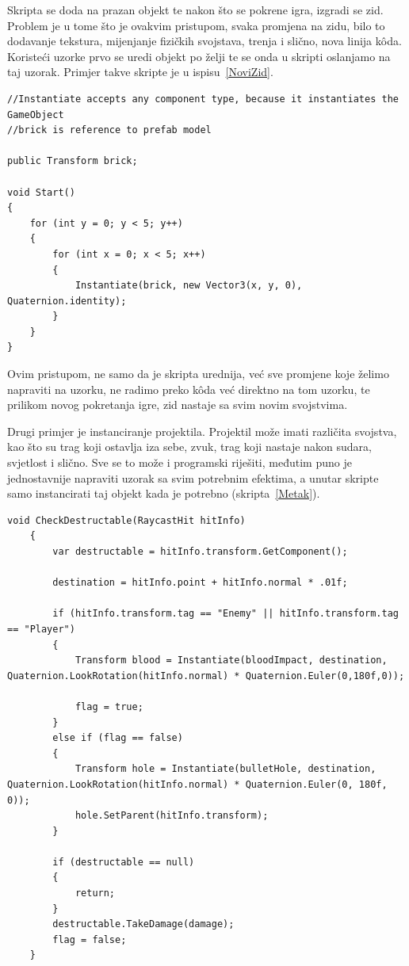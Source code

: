 Skripta se doda na prazan objekt te nakon što se pokrene igra, izgradi se zid. Problem je u tome što je ovakvim pristupom, svaka promjena na zidu, bilo to dodavanje tekstura, mijenjanje fizičkih svojstava, trenja i slično, nova linija k\^oda. Koristeći uzorke prvo se uredi objekt po želji te se onda u skripti oslanjamo na taj uzorak. Primjer takve skripte je u ispisu~\ref{NoviZid}.

\begin{lstlisting}[caption={Skripta za izradu zida koristeći uzorke}, label=NoviZid]
//Instantiate accepts any component type, because it instantiates the GameObject 
//brick is reference to prefab model

public Transform brick;

void Start() 
{
    for (int y = 0; y < 5; y++)
    {
        for (int x = 0; x < 5; x++) 
        {
            Instantiate(brick, new Vector3(x, y, 0), Quaternion.identity);
        }
    }
}
\end{lstlisting}

Ovim pristupom, ne samo da je skripta urednija, već sve promjene koje želimo napraviti na uzorku, ne radimo preko k\^oda već direktno na tom uzorku, te prilikom novog pokretanja igre, zid nastaje sa svim novim svojstvima.

Drugi primjer je instanciranje projektila. Projektil može imati različita svojstva, kao što su trag koji ostavlja iza sebe, zvuk, trag koji nastaje nakon sudara, svjetlost i slično. Sve se to može i programski riješiti, međutim puno je jednostavnije napraviti uzorak sa svim potrebnim efektima, a unutar skripte samo instancirati taj objekt kada je potrebno (skripta~\ref{Metak}).

\begin{lstlisting}[caption={Instanciranje metka}, label=Metak]
void CheckDestructable(RaycastHit hitInfo)
    {
        var destructable = hitInfo.transform.GetComponent();

        destination = hitInfo.point + hitInfo.normal * .01f;

        if (hitInfo.transform.tag == "Enemy" || hitInfo.transform.tag == "Player")
        {
            Transform blood = Instantiate(bloodImpact, destination, Quaternion.LookRotation(hitInfo.normal) * Quaternion.Euler(0,180f,0));
           
            flag = true;
        }
        else if (flag == false)
        {
            Transform hole = Instantiate(bulletHole, destination, Quaternion.LookRotation(hitInfo.normal) * Quaternion.Euler(0, 180f, 0));
            hole.SetParent(hitInfo.transform);
        }

        if (destructable == null)
        {
            return;
        }
        destructable.TakeDamage(damage);
        flag = false;
    }
\end{lstlisting}

